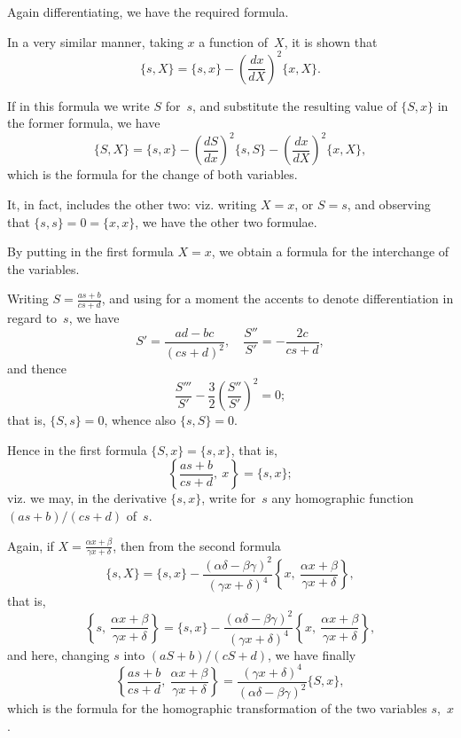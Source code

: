 \documentclass[11pt,a4paper]{book}
\begin{document}
\begin{art}
Again differentiating, we have the required formula.

In a very similar manner, taking $x$ a function of~$X$, it is shown that
\[
\{s, X\} = \{s, x\} - \left(\frac{dx}{dX}\right)^2 \{x, X\}.
\]
\end{art}

\begin{art}
If in this formula we write $S$ for~$s$, and substitute the resulting value
of $\{S, x\}$ in the former formula, we have
\[
\{S, X\} = \{s, x\} - \left(\frac{dS}{dx}\right)^2 \{s, S\}
- \left(\frac{dx}{dX}\right)^2 \{x, X\},
\]
which is the formula for the change of both variables.

It, in fact, includes the other two: viz. writing $X = x$, or $S = s$, and
observing that $\{s, s\} = 0 = \{x, x\}$, we have the other two formulae.
\end{art}

\begin{art}
By putting in the first formula $X = x$, we obtain a formula for the
interchange of the variables.
\end{art}

\begin{art}
Writing $S = \frac{as+b}{cs+d}$, and using for a moment the accents to denote
differentiation in regard to~$s$, we have
\[
S' = \frac{ad-bc}{(cs+d)^2}, \quad
\frac{S''}{S'} = -\frac{2c}{cs+d},
\]
and thence
\[
\frac{S'''}{S'} - \frac{3}{2}\left(\frac{S''}{S'}\right)^2 = 0;
\]
that is, $\{S, s\} = 0$, whence also $\{s, S\} = 0$.
\end{art}


\begin{art}
Hence in the first formula $\{S, x\} = \{s, x\}$, that is,
\[
\left\{\frac{as+b}{cs+d},\ x\right\} = \{s, x\};
\]
viz. we may, in the derivative $\{s, x\}$, write for~$s$ any homographic
function $(as+b)/(cs+d)$ of~$s$.
\end{art}

\begin{art}
Again, if $X = \frac{\alpha x + \beta}{\gamma x + \delta}$, then from the
second formula
\[
\{s, X\} = \{s, x\} - \frac{(\alpha\delta - \beta\gamma)^2}{(\gamma x + \delta)^4}
\left\{x,\ \frac{\alpha x + \beta}{\gamma x + \delta}\right\},
\]
that is,
\[
\left\{s,\ \frac{\alpha x + \beta}{\gamma x + \delta}\right\}
= \{s, x\} - \frac{(\alpha\delta - \beta\gamma)^2}{(\gamma x + \delta)^4}
\left\{x,\ \frac{\alpha x + \beta}{\gamma x + \delta}\right\},
\]
and here, changing $s$ into $(aS+b)/(cS+d)$, we have finally
\[
\left\{\frac{as+b}{cs+d},\ \frac{\alpha x + \beta}{\gamma x + \delta}\right\}
= \frac{(\gamma x + \delta)^4}{(\alpha\delta - \beta\gamma)^2} \{S, x\},
\]
which is the formula for the homographic transformation of the two
variables $s$,~$x$.
\end{art}
\end{document}
